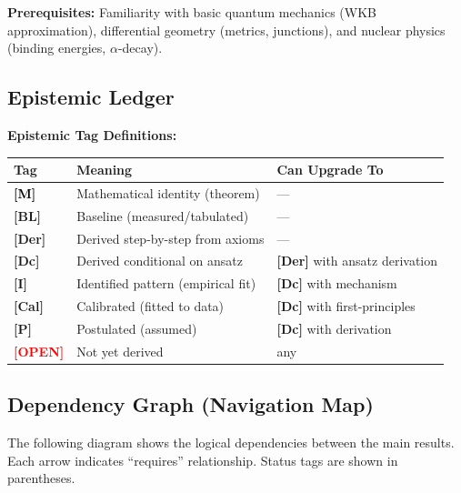 \documentclass[11pt,a4paper]{article}
\newcommand{\tagP}{\textcolor{red!70!black}{\textbf{[P]}}}
\newcommand{\tagI}{\textcolor{orange!80!black}{\textbf{[I]}}}
\newcommand{\tagDc}{\textcolor{blue!70!black}{\textbf{[Dc]}}}
\newcommand{\tagDer}{\textcolor{green!50!black}{\textbf{[Der]}}}
\newcommand{\tagCal}{\textcolor{purple!70!black}{\textbf{[Cal]}}}
\newcommand{\tagBL}{\textcolor{gray!70!black}{\textbf{[BL]}}}
\newcommand{\tagOPEN}{\textcolor{red}{\textbf{[OPEN]}}}
\newcommand{\tagM}{\textcolor{black}{\textbf{[M]}}}
\begin{document}
\textbf{Prerequisites:} Familiarity with basic quantum mechanics (WKB approximation), differential geometry (metrics, junctions), and nuclear physics (binding energies, $\alpha$-decay).

\subsection*{Epistemic Ledger}

\begin{statusbox}
\textbf{Epistemic Tag Definitions:}

\begin{tabular}{lll}
\toprule
\textbf{Tag} & \textbf{Meaning} & \textbf{Can Upgrade To} \\
\midrule
\tagM & Mathematical identity (theorem) & --- \\
\tagBL & Baseline (measured/tabulated) & --- \\
\tagDer & Derived step-by-step from axioms & --- \\
\tagDc & Derived conditional on ansatz & \tagDer{} with ansatz derivation \\
\tagI & Identified pattern (empirical fit) & \tagDc{} with mechanism \\
\tagCal & Calibrated (fitted to data) & \tagDc{} with first-principles \\
\tagP & Postulated (assumed) & \tagDc{} with derivation \\
\tagOPEN & Not yet derived & any \\
\bottomrule
\end{tabular}
\end{statusbox}

\subsection*{Dependency Graph (Navigation Map)}

The following diagram shows the logical dependencies between the main results. Each arrow indicates ``requires'' relationship. Status tags are shown in parentheses.
\end{document}
